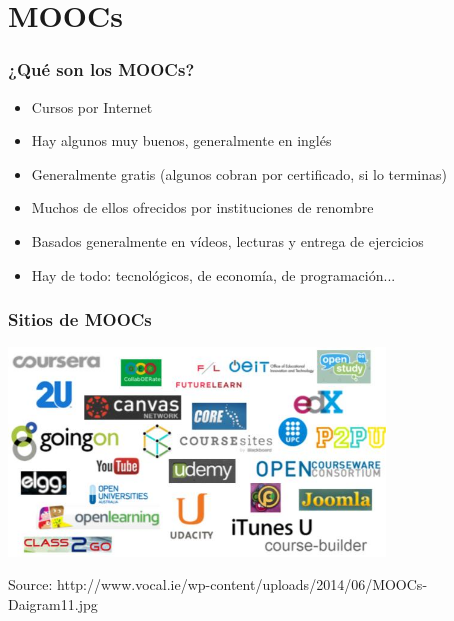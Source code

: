 \section{MOOCs}


\begin{frame}
\frametitle{¿Qué son los MOOCs?}

\begin{itemize}
   \item Cursos por Internet
   \item Hay algunos muy buenos, generalmente en inglés
   \item Generalmente gratis (algunos cobran por certificado, si lo terminas)
   \item Muchos de ellos ofrecidos por instituciones de renombre
   \item Basados generalmente en vídeos, lecturas y entrega de ejercicios
   \item Hay de todo: tecnológicos, de economía, de programación...
\end{itemize}

\end{frame}



\begin{frame}
\frametitle{Sitios de MOOCs}

\begin{center}
  \includegraphics[width=10cm]{figs/sitios.jpg}
\end{center}


\begin{flushright}
{\tiny
Source: http://www.vocal.ie/wp-content/uploads/2014/06/MOOCs-Daigram11.jpg
}
\end{flushright}

\end{frame}

